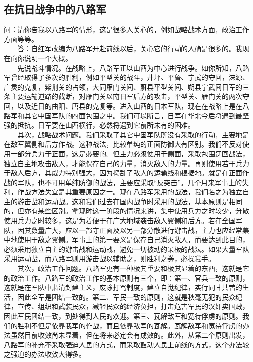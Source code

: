 \documentclass[cn,11pt,chinese]{elegantbook}
\def\myformat#1{\hfil\hfil #1}
\begin{document}
\subsection*{\myformat{在抗日战争中的八路军}}
问：请你告我以八路军的情形，这是很多人关心的，例如战略战术方面，政治工作方面等等。\\
　　答：自红军改编为八路军开赴前线以后，关心它的行动的人确是很多的。我现在向你说明一个大概。\\
　　先说战斗情况。在战略上，八路军正以山西为中心进行战争。如你所知，八路军曾经取得了多次的胜利，例如平型关的战斗，井坪、平鲁、宁武的夺回，涞源、广灵的克复，紫荆关的占领，大同雁门关间、蔚县平型关间、朔县宁武间日军的三条主要运输道路的截断，对雁门关以南日军后方的攻击，平型关、雁门关的两次夺回，以及近日的曲阳、唐县的克复等。进入山西的日本军队，现在在战略上是在八路军和其它中国军队的四面包围之中。我们可以断言，日军在华北今后将遇到最坚强的抵抗。日军要在山西横行，必然将遇到它前所未有的困难。\\
　　其次，战略战术问题。我们采取了其它中国军队所没有采取的行动，主要地是在敌军翼侧和后方作战。这种战法，比较单纯的正面防御大有区别。我们不反对使用一部分兵力于正面，这是必要的。但主力必须使用于侧面，采取包围迂回战法，独立自主地攻击敌人，才能保存自己的力量，消灭敌人的力量。再则使用若干兵力于敌人后方，其威力特别强大，因为捣乱了敌人的运输线和根据地。就是在正面作战的军队，也不可用单纯防御的战法，主要应采取“反突击”。几个月来军事上的失利，作战方法失宜是其重要原因之一。现在八路军采用的战法，我们名之为独立自主的游击战和运动战。这和我们过去在国内战争时采用的战法，基本原则是相同的，但亦有某些区别。拿现时这一阶段的情况来讲，集中使用兵力之时较少，分散使用兵力之时较多，这是为着便于在广大地域袭击敌人翼侧和后方。若在全国军队，因其数量广大，应以一部守正面及以另一部分散进行游击战，主力也应经常集中地使用于敌之翼侧。军事上的第一要义是保存自己消灭敌人，而要达到此目的，必须采用独立自主的游击战和运动战，避免一切被动的呆板的战法。如果大量军队采用运动战，而八路军则用游击战以辅助之，则胜利之券，必操我手。\\
　　其次，政治工作问题。八路军更有一种极其重要和极其显着的东西，这就是它的政治工作。八路军的政治工作的基本原则有三个，即：第一、官兵一致的原则，这就是在军队中肃清封建主义，废除打骂制度，建立自觉纪律，实行同甘共苦的生活，因此全军是团结一致的。第二、军民一致的原则，这就是秋毫无犯的民众纪律，宣传、组织和武装民众，减轻民众的经济负担，打击危害军民的汉奸卖国贼，因此军民团结一致，到处得到人民的欢迎。第三、瓦解敌军和宽待俘虏的原则。我们的胜利不但是依靠我军的作战，而且依靠敌军的瓦解。瓦解敌军和宽待俘虏的办法虽然目前收效尚未显着，但在将来必定会有成效的。此外，从第二个原则出发，八路军的补充不采取强迫人民的方式，而采取鼓动人民上前线的方式，这个办法较之强迫的办法收效大得多。\\
\end{document}
